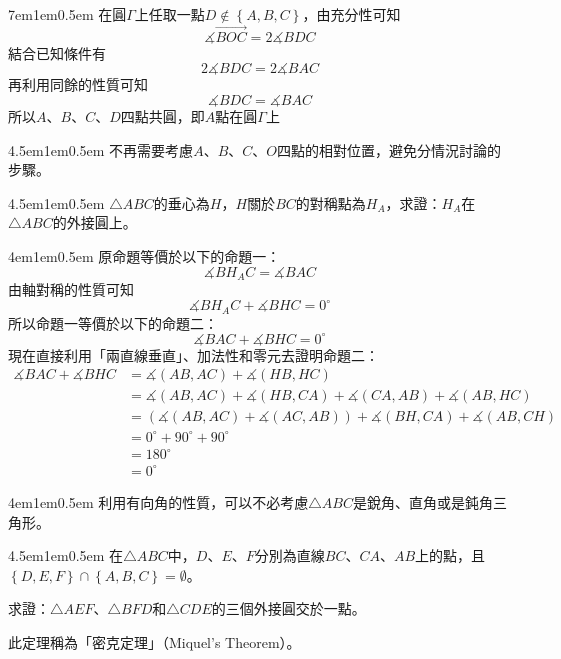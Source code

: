 \documentclass[12pt]{article}
\begin{document}
\begin{mybox}[必要性證明]{7em}{1em}{0.5em}
    在圓$\Gamma$上任取一點$D\notin\left\{A,B,C\right\}$，由充分性可知
    $$
        \measuredangle{\overrightarrow{BOC}}=2\measuredangle{BDC}
    $$
    結合已知條件有
    $$
        2\measuredangle{BDC}=2\measuredangle{BAC}
    $$
    再利用同餘的性質可知
    $$
        \measuredangle{BDC}=\measuredangle{BAC}
    $$
    所以$A$、$B$、$C$、$D$四點共圓，即$A$點在圓$\Gamma$上
\end{mybox}
\begin{mybox}[意義]{4.5em}{1em}{0.5em}
    不再需要考慮$A$、$B$、$C$、$O$四點的相對位置，避免分情況討論的步驟。
\end{mybox}
\begin{mybox}[例題2]{4.5em}{1em}{0.5em}
    $\triangle{ABC}$的垂心為$H$，$H$關於$BC$的對稱點為$H_A$，求證：$H_A$在$\triangle{ABC}$的外接圓上。
\end{mybox}
\begin{mybox}[證明]{4em}{1em}{0.5em}
    原命題等價於以下的命題一：
    $$
        \measuredangle{BH_AC}=\measuredangle{BAC}
    $$
    由軸對稱的性質可知
    $$
        \measuredangle{BH_AC}+\measuredangle{BHC}=0^{\circ}
    $$
    所以命題一等價於以下的命題二：
    $$
        \measuredangle{BAC}+\measuredangle{BHC}=0^{\circ}
    $$
    現在直接利用「兩直線垂直」、加法性和零元去證明命題二：
    \begin{align*}
        \measuredangle{BAC}+\measuredangle{BHC}&=\measuredangle{\left(AB,AC\right)}+\measuredangle{\left(HB,HC\right)}\\
        &=\measuredangle{\left(AB,AC\right)}+\measuredangle{\left(HB,CA\right)}+\measuredangle{\left(CA,AB\right)}+\measuredangle{\left(AB,HC\right)}\\
        &=\left(\measuredangle{\left(AB,AC\right)}+\measuredangle{\left(AC,AB\right)}\right)+\measuredangle{\left(BH,CA\right)}+\measuredangle{\left(AB,CH\right)}\\
        &=0^{\circ}+90^{\circ}+90^{\circ}\\
        &=180^{\circ}\\
        &=0^{\circ}
    \end{align*}
\end{mybox}
\begin{mybox}[意義]{4em}{1em}{0.5em}
    利用有向角的性質，可以不必考慮$\triangle{ABC}$是銳角、直角或是鈍角三角形。
\end{mybox}
\begin{mybox}[例題3]{4.5em}{1em}{0.5em}
    在$\triangle{ABC}$中，$D$、$E$、$F$分別為直線$BC$、$CA$、$AB$上的點，且$\left\{D,E,F\right\}\cap\left\{A,B,C\right\}=\emptyset$。

    求證：$\triangle{AEF}$、$\triangle{BFD}$和$\triangle{CDE}$的三個外接圓交於一點。

    此定理稱為「密克定理」（Miquel's Theorem）。
\end{mybox}
\end{document}
